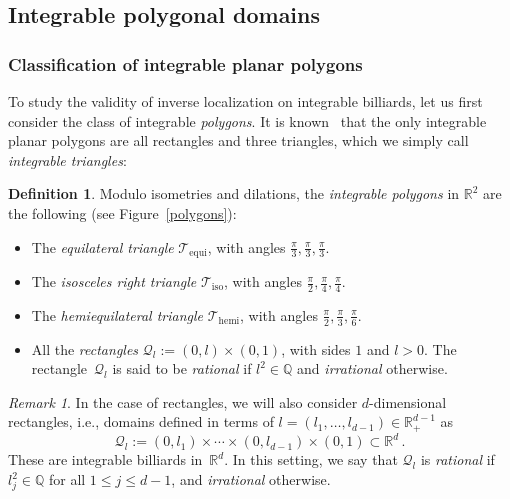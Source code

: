 \documentclass{amsart}
\theoremstyle{definition}
\newtheorem{definition}[theorem]{Definition}
\theoremstyle{remark}
\newtheorem{remark}[theorem]{Remark}
\def\RR{\mathbb{R}}
\renewcommand\leq\leqslant
\numberwithin{equation}{section}
\theoremstyle{definition}
\theoremstyle{remark}
\def\RR{\mathbb{R}}
\begin{document}
\subsection{Integrable polygonal domains}

\subsubsection{Classification of integrable planar polygons}

To study the validity of inverse localization on integrable billiards, let us first consider the class of integrable {\em polygons}\/. It is known~\cite{GutkinII} that the only integrable planar polygons are all rectangles and three triangles, which we simply call {\em integrable triangles}\/:

\begin{definition}\label{IntPol}
	Modulo isometries and dilations, the {\em integrable polygons}\/ in $\RR^2$ are the following (see Figure~\ref{polygons}):
		\begin{itemize}
			\item The {\em equilateral triangle}\/ $\mathcal{T}_{\mathrm{equi}}$,  with angles $\frac{\pi}{3},\frac{\pi}{3},\frac{\pi}{3}$.
			\item The {\em isosceles right triangle}\/ $\mathcal{T}_{\mathrm{iso}}$, with angles $\frac{\pi}{2},\frac{\pi}{4},\frac{\pi}{4}$.
			\item The {\em hemiequilateral triangle}\/ $\mathcal{T}_{\mathrm{hemi}}$, with angles $\frac{\pi}{2},\frac{\pi}{3},\frac{\pi}{6}$.
		\item All the {\em rectangles}\/ $\mathcal{Q}_l:=(0,l)\times(0,1)$, with sides $1$ and $l>0$. The rectangle~$\mathcal Q_l$ is said to be {\em rational}\/ if $l^2\in\mathbb{Q}$ and {\em irrational}\/ otherwise.
		\end{itemize}
\end{definition}
\begin{remark}
	In the case of rectangles, we will also consider $d$-dimensional rectangles, i.e., domains defined in terms of $l=(l_1,\dots,l_{d-1})\in\RR_+^{d-1}$ as
	\begin{equation}
		\mathcal{Q}_l:=(0,l_1)\times\cdots \times (0,l_{d-1})\times (0,1)\subset \RR^d\,.
	\end{equation}
	These are integrable billiards in~$\RR^d$. In this setting, we say that $\mathcal{Q}_l$ is {\em  rational} if $l_j^2\in\mathbb{Q}$ for all $1\leq j\leq d-1$, and  {\em irrational} otherwise.  
\end{remark}
\end{document}
